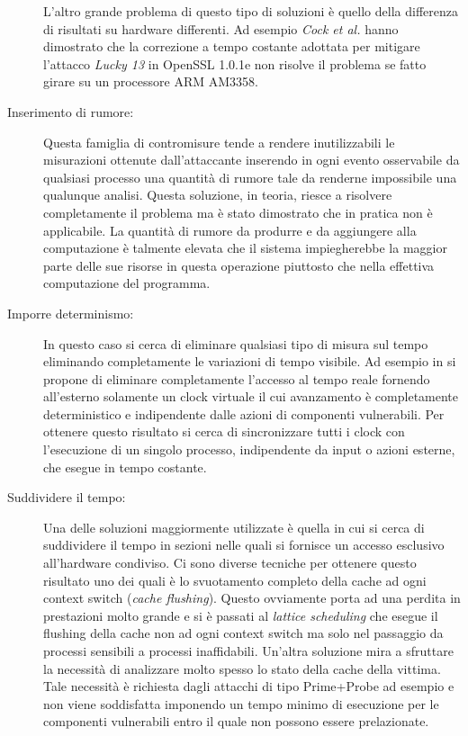 \begin{description}
				L'altro grande problema di questo tipo di soluzioni è quello della differenza di risultati su hardware differenti. Ad esempio \emph{Cock et al.}\cite{cock2014last} hanno dimostrato che la correzione a tempo costante adottata per mitigare l'attacco \emph{Lucky 13}\cite{al2013lucky} in OpenSSL 1.0.1e non risolve il problema se fatto girare su un processore ARM AM3358. 
				\item[Inserimento di rumore:] Questa famiglia di contromisure tende a rendere inutilizzabili le misurazioni ottenute dall'attaccante inserendo in ogni evento osservabile da qualsiasi processo una quantità di rumore tale da renderne impossibile una qualunque analisi\cite{hu1992reducing}. Questa soluzione, in teoria, riesce a risolvere completamente il problema ma è stato dimostrato\cite{cock2014last} che in pratica non è applicabile. La quantità di rumore da produrre e da aggiungere alla computazione è talmente elevata che il sistema impiegherebbe la maggior parte delle sue risorse in questa operazione piuttosto che nella effettiva computazione del programma.
				\item[Imporre determinismo:] In questo caso si cerca di eliminare qualsiasi tipo di misura sul tempo eliminando completamente le variazioni di tempo visibile. Ad esempio in \cite{aviram2012efficient} si propone di eliminare completamente l'accesso al tempo reale fornendo all'esterno solamente un clock virtuale il cui avanzamento è completamente deterministico e indipendente dalle azioni di componenti vulnerabili. Per ottenere questo risultato si cerca di sincronizzare tutti i clock con l'esecuzione di un singolo processo, indipendente da input o azioni esterne, che esegue in tempo costante.
				\item[Suddividere il tempo:] Una delle soluzioni maggiormente utilizzate è quella in cui si cerca di suddividere il tempo in sezioni nelle quali si fornisce un accesso esclusivo all'hardware condiviso. Ci sono diverse tecniche per ottenere questo risultato uno dei quali è lo svuotamento completo della cache ad ogni context switch (\emph{cache flushing}\cite{zhang2013duppel}). Questo ovviamente porta ad una perdita in prestazioni molto grande e si è passati al \emph{lattice scheduling}\cite{denning1976lattice} che esegue il flushing della cache non ad ogni context switch ma solo nel passaggio da processi sensibili a processi inaffidabili. Un'altra soluzione\cite{varadarajan2014scheduler} mira a sfruttare la necessità di analizzare molto spesso lo stato della cache della vittima. Tale necessità è richiesta dagli attacchi di tipo Prime+Probe ad esempio e non viene soddisfatta imponendo un tempo minimo di esecuzione per le componenti vulnerabili entro il quale non possono essere prelazionate.

\end{description}
